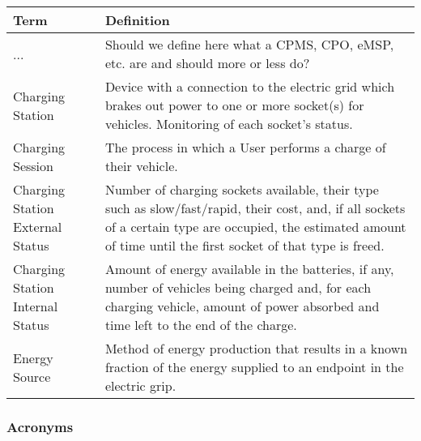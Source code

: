 \documentclass[11pt]{article}
\begin{document}
\begin{table}[H]
    \centering
    \setlength{\tabcolsep}{18pt}
    \renewcommand{\arraystretch}{1.2}
    \begin{tabularx}{\textwidth}{|>{\centering\hsize=0.3\hsize}X|>{\hsize=1.7\hsize}X|}
        \hline
        \textbf{Term} & \textbf{Definition} \\
        \hline
        ... & Should we define here what a CPMS, CPO, eMSP, etc. are and should more or less do? \\
        \hline
        Charging Station & Device with a connection to the electric grid which brakes out power to one or more socket(s) for vehicles. Monitoring of each socket's status. \\
        \hline
        Charging Session & The process in which a User performs a charge of their vehicle. \\
        \hline
        Charging Station External Status & Number of charging sockets available, their type such as slow/fast/rapid, their cost, and, if all sockets of a certain type are occupied, the estimated amount of time until the first socket of that type is freed. \\
        \hline
        Charging Station Internal Status & Amount of energy available in the batteries, if any, number of vehicles being charged and, for each charging vehicle, amount of power absorbed and time left to the end of the charge. \\
        \hline
        Energy Source & Method of energy production that results in a known fraction of the energy supplied to an endpoint in the electric grip. \\
        \hline
    \end{tabularx}
    \label{tab:definitions}
\end{table}

\subsubsection{Acronyms}
\end{document}
